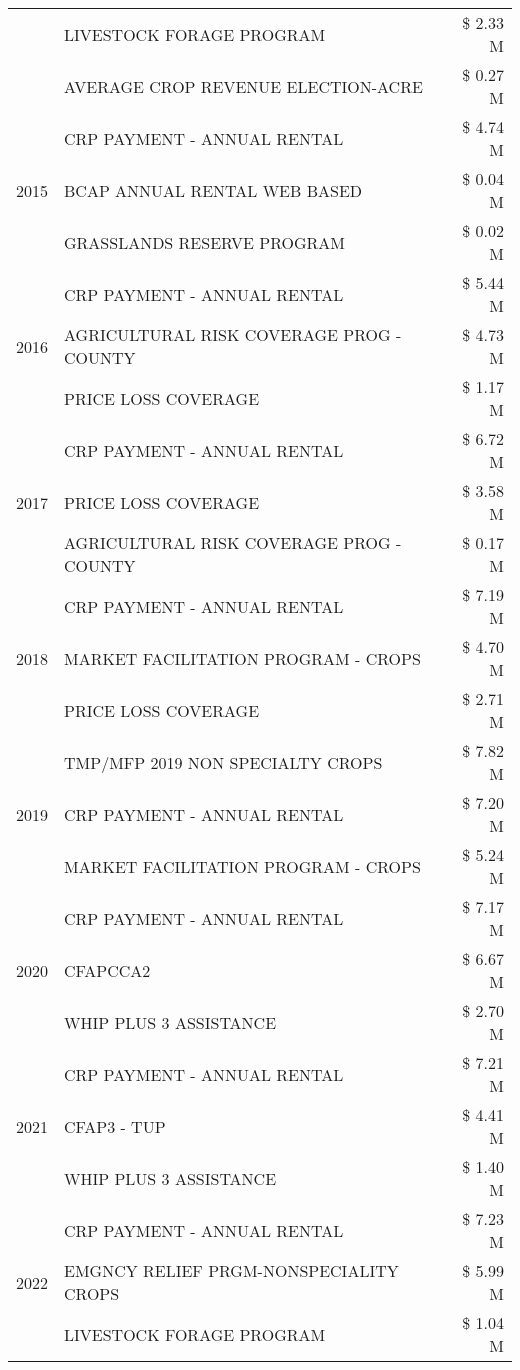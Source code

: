 \begin{tabular}{llr}
 & LIVESTOCK FORAGE PROGRAM & \$ 2.33 M \\
 & AVERAGE CROP REVENUE ELECTION-ACRE & \$ 0.27 M \\
\cline{1-3}
\multirow[t]{3}{*}{2015} & CRP PAYMENT - ANNUAL RENTAL & \$ 4.74 M \\
 & BCAP ANNUAL RENTAL WEB BASED & \$ 0.04 M \\
 & GRASSLANDS RESERVE PROGRAM & \$ 0.02 M \\
\cline{1-3}
\multirow[t]{3}{*}{2016} & CRP PAYMENT - ANNUAL RENTAL & \$ 5.44 M \\
 & AGRICULTURAL RISK COVERAGE PROG - COUNTY & \$ 4.73 M \\
 & PRICE LOSS COVERAGE & \$ 1.17 M \\
\cline{1-3}
\multirow[t]{3}{*}{2017} & CRP PAYMENT - ANNUAL RENTAL & \$ 6.72 M \\
 & PRICE LOSS COVERAGE & \$ 3.58 M \\
 & AGRICULTURAL RISK COVERAGE PROG - COUNTY & \$ 0.17 M \\
\cline{1-3}
\multirow[t]{3}{*}{2018} & CRP PAYMENT - ANNUAL RENTAL & \$ 7.19 M \\
 & MARKET FACILITATION PROGRAM - CROPS & \$ 4.70 M \\
 & PRICE LOSS COVERAGE & \$ 2.71 M \\
\cline{1-3}
\multirow[t]{3}{*}{2019} & TMP/MFP 2019 NON SPECIALTY CROPS & \$ 7.82 M \\
 & CRP PAYMENT - ANNUAL RENTAL & \$ 7.20 M \\
 & MARKET FACILITATION PROGRAM - CROPS & \$ 5.24 M \\
\cline{1-3}
\multirow[t]{3}{*}{2020} & CRP PAYMENT - ANNUAL RENTAL & \$ 7.17 M \\
 & CFAPCCA2 & \$ 6.67 M \\
 & WHIP PLUS 3 ASSISTANCE & \$ 2.70 M \\
\cline{1-3}
\multirow[t]{3}{*}{2021} & CRP PAYMENT - ANNUAL RENTAL & \$ 7.21 M \\
 & CFAP3 - TUP & \$ 4.41 M \\
 & WHIP PLUS 3 ASSISTANCE & \$ 1.40 M \\
\cline{1-3}
\multirow[t]{3}{*}{2022} & CRP PAYMENT - ANNUAL RENTAL & \$ 7.23 M \\
 & EMGNCY RELIEF PRGM-NONSPECIALITY CROPS & \$ 5.99 M \\
 & LIVESTOCK FORAGE PROGRAM & \$ 1.04 M \\
\cline{1-3}
\bottomrule
\end{tabular}
